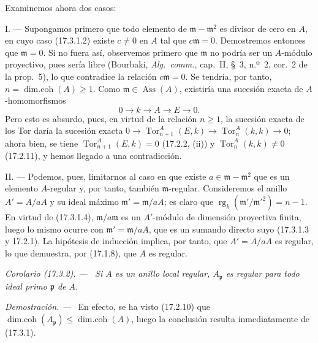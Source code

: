 \documentclass[10pt,oneside]{book}
\makeatletter
\newcommand{\setmanualcurrentlabel}[1]{\def\@currentlabel{#1}}
\newcommand{\oldpage}[2][]{%
  \setcounter{footnote}{0}%
  \marginpar{\scriptsize\textbf{#1}~|~#2}\ignorespaces}
\newenvironment{corollary}[1][]{%
  \setmanualcurrentlabel{#1}\par\medskip\noindent\itshape Corolario (#1). ---\ }{\par}
\newenvironment{proof}{%
  \par\medskip\noindent\textit{Demostración. ---\ }}{\par}
\providecommand{\setmin}{-}%
\makeatother
\begin{document}
Examinemos ahora dos casos:

\medskip\noindent I. --- Supongamos primero que todo elemento de
$\mathfrak m\setmin\mathfrak{m}^2$ es divisor de cero en $A$, en cuyo caso
(17.3.1.2) existe $c\neq0$ en $A$ tal que $c\mathfrak{m}=0$. Demostremos
entonces que $\mathfrak{m}=0$. Si no fuera así, observemos primero que
$\mathfrak{m}$ no podría ser un $A$-módulo proyectivo, pues sería libre
(Bourbaki, \emph{Alg.~comm.}, cap.~II, \S~3, n.º~2, cor.~2 de la prop.~5),
lo que contradice la relación $c\mathfrak{m}=0$. Se tendría, por tanto,
$n=\operatorname{dim.coh}(A)\geq1$. Como
$\mathfrak{m}\in\operatorname{Ass}(A)$, existiría una sucesión exacta de
$A$-homomorfismos
\[
  0\longrightarrow k\longrightarrow A\longrightarrow E\longrightarrow0.
\]
Pero esto es absurdo, pues, en virtud de la relación $n\geq1$, la sucesión
exacta de los Tor daría la sucesión exacta
$0\longrightarrow\operatorname{Tor}^A_{n+1}(E,k)\longrightarrow
\operatorname{Tor}^A_n(k,k)\longrightarrow0$; ahora bien, se tiene
$\operatorname{Tor}^A_{n+1}(E,k)=0$ (17.2.2, (ii)) y
$\operatorname{Tor}^A_n(k,k)\neq0$ (17.2.11), y hemos llegado a una
contradicción.

\medskip\noindent II. --- Podemos, pues, limitarnos al caso en que
existe $a\in\mathfrak m\setmin\mathfrak{m}^2$ que es un elemento $A$-regular y, por
tanto, también $\mathfrak{m}$-regular. Consideremos el anillo $A'=A/aA$ y su
ideal
\oldpage[0\textsubscript{IV-1}]{48}
máximo $\mathfrak{m}'=\mathfrak{m}/aA$; es claro que
$\operatorname{rg}_k(\mathfrak{m}'/\mathfrak{m}'^2)=n\setmin 1$. En virtud de
(17.3.1.4), $\mathfrak{m}/a\mathfrak{m}$ es un $A'$-módulo de dimensión
proyectiva finita, luego lo mismo ocurre con
$\mathfrak{m}'=\mathfrak{m}/aA$, que es un sumando directo suyo (17.3.1.3 y
17.2.1). La hipótesis de inducción implica, por tanto, que $A'=A/aA$ es
regular, lo que demuestra, por (17.1.8), que $A$ es regular.

\begin{corollary}[17.3.2]
\label{0.17.3.2-es}
Si $A$ es un anillo local regular, $A_{\mathfrak{p}}$ es regular para todo
ideal primo $\mathfrak{p}$ de $A$.
\end{corollary}

\begin{proof}
En efecto, se ha visto (17.2.10) que
$\operatorname{dim.coh}(A_{\mathfrak{p}})\leq
\operatorname{dim.coh}(A)$, luego la conclusión resulta inmediatamente de
(17.3.1).
\end{proof}
\end{document}

